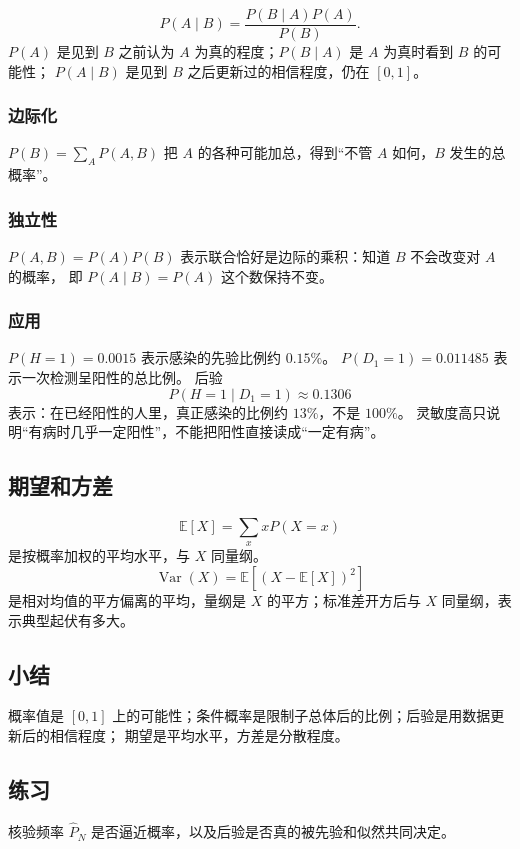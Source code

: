 \[
P(A\mid B)
=
\frac{P(B\mid A)P(A)}{P(B)}.
\]
$P(A)$ 是见到 $B$ 之前认为 $A$ 为真的程度；$P(B\mid A)$ 是 $A$ 为真时看到 $B$ 的可能性；
$P(A\mid B)$ 是见到 $B$ 之后更新过的相信程度，仍在 $[0,1]$。

\subsubsection{边际化}

$P(B)=\sum_A P(A,B)$ 把 $A$ 的各种可能加总，得到“不管 $A$ 如何，$B$ 发生的总概率”。

\subsubsection{独立性}

$P(A,B)=P(A)P(B)$ 表示联合恰好是边际的乘积：知道 $B$ 不会改变对 $A$ 的概率，
即 $P(A\mid B)=P(A)$ 这个数保持不变。

\subsubsection{应用}

$P(H=1)=0.0015$ 表示感染的先验比例约 $0.15\%$。
$P(D_1=1)=0.011485$ 表示一次检测呈阳性的总比例。
后验
\[
P(H=1\mid D_1=1)\approx 0.1306
\]
表示：在已经阳性的人里，真正感染的比例约 $13\%$，不是 $100\%$。
灵敏度高只说明“有病时几乎一定阳性”，不能把阳性直接读成“一定有病”。

\subsection{期望和方差}

\[
\mathbb{E}[X]=\sum_x xP(X=x)
\]
是按概率加权的平均水平，与 $X$ 同量纲。
\[
\operatorname{Var}(X)=\mathbb{E}[(X-\mathbb{E}[X])^2]
\]
是相对均值的平方偏离的平均，量纲是 $X$ 的平方；标准差开方后与 $X$ 同量纲，表示典型起伏有多大。

\subsection{小结}

概率值是 $[0,1]$ 上的可能性；条件概率是限制子总体后的比例；后验是用数据更新后的相信程度；
期望是平均水平，方差是分散程度。

\subsection{练习}

核验频率 $\widehat{P}_N$ 是否逼近概率，以及后验是否真的被先验和似然共同决定。

